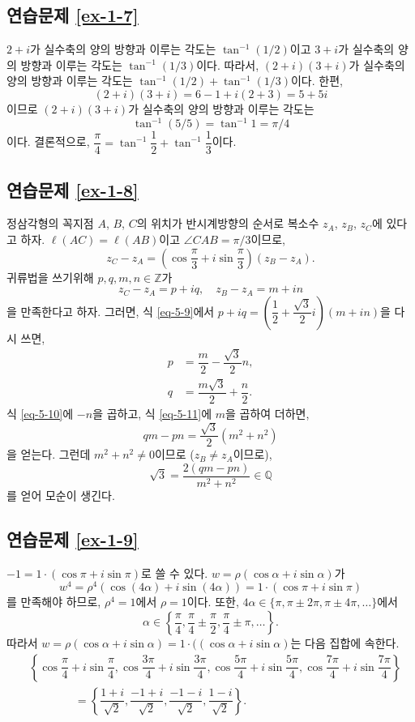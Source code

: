 \subsection*{연습문제 \ref{ex-1-7}}

$2+i$가 실수축의 양의 방향과 이루는 각도는 $\tan^{-1}(1/2)$이고
$3+i$가 실수축의 양의 방향과 이루는 각도는 $\tan^{-1}(1/3)$이다.
따라서, $(2+i)(3+i)$가 실수축의 양의 방향과 이루는 각도는 
$\tan^{-1}(1/2) + \tan^{-1}(1/3)$이다.
한편,
\[
(2+i)(3+i) = 6 - 1 + i(2+3) = 5 + 5i
\]
이므로 $(2+i)(3+i)$가  실수축의 양의 방향과 이루는 각도는
\[
\tan^{-1} (5/5) = \tan^{-1} 1 = \pi/4
\]
이다. 결론적으로, 
$\dfrac\pi4 = \tan^{-1}\dfrac12 + \tan^{-1}\dfrac13$이다.

\subsection*{연습문제 \ref{ex-1-8}}

정삼각형의 꼭지점  $A$, $B$, $C$의 위치가 
반시계방향의 순서로 복소수 $z_A$, $z_B$, $z_C$에 있다고 하자.
$\ell(AC) = \ell(AB)$이고 $\angle CAB=\pi/3$이므로,
\begin{equation}\label{eq-5-9}
z_C - z_A = \left( \cos\dfrac\pi3 + i\sin\dfrac\pi3 \right)(z_B - z_A).
\end{equation}
귀류법을 쓰기위해 $p,q,m,n\in\mathbb Z$가 
\[
z_C - z_A = p+iq, \quad
z_B - z_A = m+in
\]
을 만족한다고  하자.
그러면, 식 \eqref{eq-5-9}에서
$p+iq = \left(\dfrac12 + \dfrac{\sqrt{3}}2i\right)(m+in)$을 다시 쓰면,
\begin{align}
p &= \dfrac m2 - \dfrac{\sqrt{3}}2n, \label{eq-5-10} \\
q &= \dfrac{m\sqrt{3}}2 + \dfrac n2. \label{eq-5-11}
\end{align}
식 \eqref{eq-5-10}에 $-n$을 곱하고,
식 \eqref{eq-5-11}에 $m$을 곱하여 더하면,
\[
qm - pn = \dfrac{\sqrt{3}}2 (m^2 + n^2)
\]
을 얻는다.
그런데 $m^2+n^2 \ne0$이므로 ($z_B \ne z_A$이므로),
\[
\sqrt{3} = \dfrac{2(qm-pn)}{m^2+n^2} \in \mathbb Q
\]
를 얻어 모순이 생긴다.

\subsection*{연습문제 \ref{ex-1-9}}

$-1 = 1 \cdot (\cos \pi + i \sin \pi)$로 쓸 수 있다.
$w = \rho(\cos\alpha + i\sin\alpha)$가 
\[
w^4 = \rho^4(\cos(4\alpha) + i\sin(4\alpha)) = 1 \cdot (\cos \pi + i \sin \pi)
\]
를 만족해야 하므로,
$\rho^4 = 1$에서 $\rho=1$이다.
또한, $4\alpha \in \{ \pi, \pi\pm2\pi, \pi\pm4\pi, \ldots\}$에서
\[
\alpha \in \left\{ \dfrac\pi4, \dfrac\pi4\pm\dfrac\pi2, \dfrac\pi4\pm\pi,\ldots
\right\}.
\]
따라서 $ w = \rho(\cos\alpha + i\sin\alpha) = 1\cdot((\cos\alpha + i\sin\alpha) $는
다음 집합에 속한다.
\begin{align*}
&\left\{ \cos\dfrac\pi4+i\sin\dfrac\pi4, \cos\dfrac{3\pi}4+i\sin\dfrac{3\pi}4, 
\cos\dfrac{5\pi}4+i\sin\dfrac{5\pi}4, \cos\dfrac{7\pi}4+i\sin\dfrac{7\pi}4
\right\} \\
&\qquad\quad\quad = \left\{ \dfrac{1+i}{\sqrt{2}},  \dfrac{-1+i}{\sqrt{2}},
 \dfrac{-1-i}{\sqrt{2}},  \dfrac{1-i}{\sqrt{2}} \right\}.
\end{align*}

